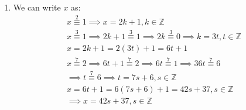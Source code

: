\begin{enumerate}[label=]
    \item 
        We can write $x$ as:
        \begin{gather*}
            x \overset{2 }{\equiv} 1 \implies x = 2k + 1 , k \in \mathbb Z\\
            x \overset{3}{\equiv} 1 \implies 2k + 1 \overset{3 }{\equiv } 1 \implies 2k \overset{3 }{\equiv } 0 \implies k = 3t, t \in \mathbb Z \\
            x = 2k + 1 = 2(3t) + 1 = 6t + 1 \\
            x \overset{7 }{\equiv } 2 \implies 6t + 1 \overset{7}{\equiv } 2 \implies 6t \overset{7 }{\equiv} 1 \implies 36t \overset{7 }{\equiv } 6 \\
            \implies t \overset{7 }{\equiv} 6 \implies t = 7s + 6 , s \in \mathbb Z\\
            x = 6t + 1 = 6(7s + 6) + 1 = 42s + 37, s \in \mathbb Z \\
            \implies x = 42s + 37 , s \in \mathbb Z
        \end{gather*}
\end{enumerate}